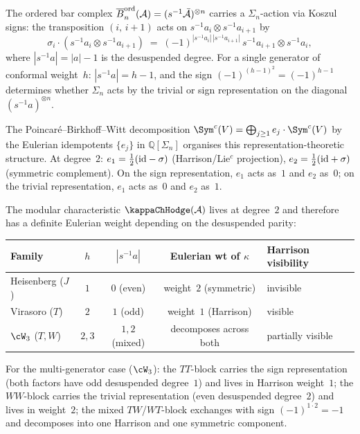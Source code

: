 \begin{remark}
\label{rem:sn-eulerian-weight}
The ordered bar complex
$\overline{B}^{\mathrm{ord}}_n(\mathcal{A}) = (s^{-1}\bar{\mathcal{A}})^{\otimes n}$ carries a
$\Sigma_n$-action via Koszul signs: the transposition
$(i,\,i{+}1)$ acts on $s^{-1}a_i \otimes s^{-1}a_{i+1}$ by
\[
\sigma_i \cdot (s^{-1}a_i \otimes s^{-1}a_{i+1})
\;=\;
(-1)^{|s^{-1}a_i|\,|s^{-1}a_{i+1}|}\,
s^{-1}a_{i+1} \otimes s^{-1}a_i,
\]
where $|s^{-1}a| = |a| - 1$ is the desuspended degree.
For a single generator of conformal weight~$h$:
$|s^{-1}a| = h - 1$, and the sign
$(-1)^{(h-1)^2} = (-1)^{h-1}$ determines whether $\Sigma_n$
acts by the trivial or sign representation on the diagonal
$(s^{-1}a)^{\otimes n}$.

The Poincar\'e--Birkhoff--Witt decomposition
$\Sym^c(V) = \bigoplus_{j \geq 1} e_j \cdot \Sym^c(V)$
by the Eulerian idempotents $\{e_j\}$ in $\mathbb{Q}[\Sigma_n]$
organises this representation-theoretic structure.
At degree~$2$: $e_1 = \tfrac{1}{2}(\mathrm{id} - \sigma)$
(Harrison/Lie${}^c$ projection), $e_2 = \tfrac{1}{2}(\mathrm{id} + \sigma)$
(symmetric complement).
On the sign representation,
$e_1$ acts as~$1$ and $e_2$ as~$0$; on the trivial
representation, $e_1$ acts as~$0$ and $e_2$ as~$1$.

The modular characteristic $\kappaChHodge(\cA)$ lives at degree~$2$
and therefore has a definite Eulerian weight depending on the
desuspended parity:
\begin{center}
\renewcommand{\arraystretch}{1.2}
\begin{tabular}{lcccl}
\textbf{Family}
& $h$
& $|s^{-1}a|$
& \textbf{Eulerian wt of $\kappa$}
& \textbf{Harrison visibility} \\
\hline
Heisenberg ($J$)
& $1$ & $0$ (even)
& weight~$2$ (symmetric)
& invisible \\
Virasoro ($T$)
& $2$ & $1$ (odd)
& weight~$1$ (Harrison)
& visible \\
$\cW_3$ ($T, W$)
& $2, 3$ & $1, 2$ (mixed)
& decomposes across both
& partially visible
\end{tabular}
\end{center}
For the multi-generator case ($\cW_3$): the $TT$-block carries
the sign representation (both factors have odd desuspended
degree~$1$) and lives in Harrison weight~$1$; the
$WW$-block carries the trivial representation (even desuspended
degree~$2$) and lives in weight~$2$; the mixed $TW$/$WT$-block
exchanges with sign $(-1)^{1 \cdot 2} = -1$ and decomposes into
one Harrison and one symmetric component.


\end{remark}
